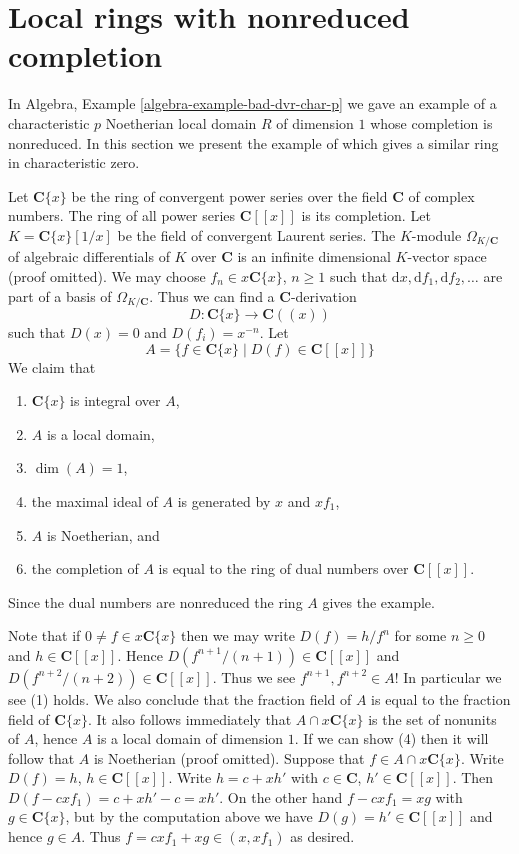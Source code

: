 \section{Local rings with nonreduced completion}
\label{section-local-completion-nonreduced}

\noindent
In Algebra, Example \ref{algebra-example-bad-dvr-char-p} we gave an example
of a characteristic $p$ Noetherian local domain $R$ of dimension $1$
whose completion is nonreduced. In this section we present the example
of \cite[Proposition 3.1]{Ferrand-Raynaud} which gives a similar
ring in characteristic zero.

\medskip\noindent
Let $\mathbf{C}\{x\}$ be the ring of convergent power series over
the field $\mathbf{C}$ of complex numbers. The ring of all power series
$\mathbf{C}[[x]]$ is its completion. Let $K = \mathbf{C}\{x\}[1/x]$
be the field of convergent Laurent series. The $K$-module
$\Omega_{K/\mathbf{C}}$ of algebraic differentials
of $K$ over $\mathbf{C}$ is an infinite dimensional $K$-vector space
(proof omitted). We may choose $f_n \in x\mathbf{C}\{x\}$,
$n \geq 1$ such that
$
\text{d}x, \text{d}f_1, \text{d}f_2, \ldots
$
are part of a basis of $\Omega_{K/\mathbf{C}}$. Thus we can
find a $\mathbf{C}$-derivation
$$
D : \mathbf{C}\{x\} \longrightarrow \mathbf{C}((x))
$$
such that $D(x) = 0$ and $D(f_i) = x^{-n}$. Let
$$
A = \{f \in \mathbf{C}\{x\} \mid D(f) \in \mathbf{C}[[x]]\}
$$
We claim that
\begin{enumerate}
\item $\mathbf{C}\{x\}$ is integral over $A$,
\item $A$ is a local domain,
\item $\dim(A) = 1$,
\item the maximal ideal of $A$ is generated by $x$ and $xf_1$,
\item $A$ is Noetherian, and
\item the completion of $A$ is equal to the ring of dual numbers
over $\mathbf{C}[[x]]$.
\end{enumerate}
Since the dual numbers are nonreduced the ring $A$ gives the example.

\medskip\noindent
Note that if $0 \not = f \in x\mathbf{C}\{x\}$ then
we may write $D(f) = h/f^n$ for some $n \geq 0$ and $h \in \mathbf{C}[[x]]$.
Hence $D(f^{n + 1}/(n + 1)) \in \mathbf{C}[[x]]$
and $D(f^{n + 2}/(n + 2)) \in \mathbf{C}[[x]]$. Thus we
see $f^{n + 1}, f^{n + 2} \in A$!
In particular we see (1) holds. We also conclude that
the fraction field of $A$ is equal to the fraction field of
$\mathbf{C}\{x\}$. It also follows immediately that
$A \cap x\mathbf{C}\{x\}$ is the set of nonunits of $A$, hence
$A$ is a local domain of dimension $1$. If we can show (4)
then it will follow that $A$ is Noetherian (proof omitted).
Suppose that $f \in A \cap x\mathbf{C}\{x\}$. Write
$D(f) = h$, $h \in \mathbf{C}[[x]]$. Write $h = c + xh'$
with $c \in \mathbf{C}$, $h' \in \mathbf{C}[[x]]$. Then
$D(f - cxf_1) = c + xh' - c = xh'$. On the other hand
$f - cxf_1 = xg$ with $g \in \mathbf{C}\{x\}$, but by the
computation above we have $D(g) = h' \in \mathbf{C}[[x]]$
and hence $g \in A$. Thus $f = cxf_1 + xg \in (x, xf_1)$ as desired.


